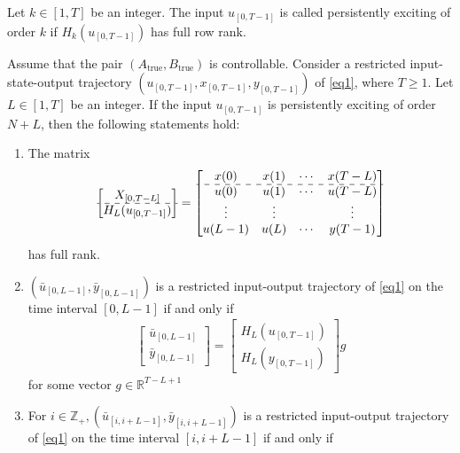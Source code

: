\documentclass[hyperref={pdfpagemode=FullScreen},aspectratio=169]{beamer}
\begin{document}
\begin{frame}{}
\begin{definition}
Let $k\in [1,T]$ be an integer. The input $u_{[0,T-1]}$ is called persistently exciting of order $k$ if $H_k(u_{[0,T-1]})$ has full row rank.
\end{definition}
\begin{theorem}
Assume that the pair  $\left(A_\text{true}, B_\text{true}\right)$ is controllable. Consider a restricted input-state-output trajectory $\left(u_{[0,T-1]} , x_{[0,T-1]} , y_{[0,T-1]}\right)$ of \cref{eq1}, where $T\geq1$. Let $L\in [1,T]$ be an integer. If the input $u_{[0,T-1]}$ is persistently exciting of order $N+L$, then the following statements hold:
\end{theorem}
\begin{enumerate}
\item The matrix
\begin{align}\label{eq3}
\begin{bmatrix}
X_{[0,T-L]} \\ 
\hdashline 
H_L(u_{[0,T-1]})
\end{bmatrix} = \begin{bmatrix}
x(0) & x(1) & \cdots & x(T-L) \\
\hdashline 
u(0) & u(1) & \cdots & u(T-L) \\
\vdots & \vdots & & \vdots \\
u(L-1) & u(L) & \cdots & y(T-1)
\end{bmatrix}
\end{align}
has full rank.
\item $\left(\bar{u}_{[0,L-1]}, \bar{y}_{[0,L-1]} \right)$ is a restricted input-output trajectory of \cref{eq1} on the time interval $[0,L-1]$ if and only if
\begin{align}\label{eq4}
\begin{bmatrix}
\bar{u}_{[0,L-1]}\\
\bar{y}_{[0,L-1]}
\end{bmatrix} = \begin{bmatrix}
H_L(u_{[0,T-1]}) \\
H_L(y_{[0,T-1]})
\end{bmatrix}g
\end{align}
for some vector $g\in \mathbb{R}^{T-L+1}$
\item For $i\in \mathbb{Z}_+, \left(\bar{u}_{[i,i+L-1]}, \bar{y}_{[i,i+L-1]} \right)$ is a restricted input-output trajectory of \cref{eq1} on the time interval $[i, i+L-1]$ if and only if
\begin{align}\label{eq5}

\end{align}
\end{enumerate}
\end{frame}
\end{document}
